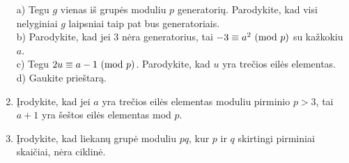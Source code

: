 \begin{enumerate}
    a) Tegu $g$ vienas iš grupės moduliu $p$ generatorių. Parodykite, kad
    visi nelyginiai $g$ laipsniai taip pat bus generatoriais.\\
    b) Parodykite, kad jei $3$ nėra generatorius, tai $-3 \equiv
    a^2\ (\text{mod } p)$ su kažkokiu $a$.\\
    c) Tegu $2u \equiv a -1 \ (\text{mod } p)$. Parodykite, kad $u$ yra trečios
    eilės elementas.\\
    d) Gaukite prieštarą.
  \item Įrodykite, kad jei $a$ yra trečios eilės elementas moduliu pirminio
    $p>3$, tai $a+1$
    yra šeštos eilės elementas mod $p$.
  \item Įrodykite, kad liekanų grupė moduliu $pq$, kur $p$ ir $q$ skirtingi
    pirminiai skaičiai, nėra ciklinė.

\end{enumerate}
